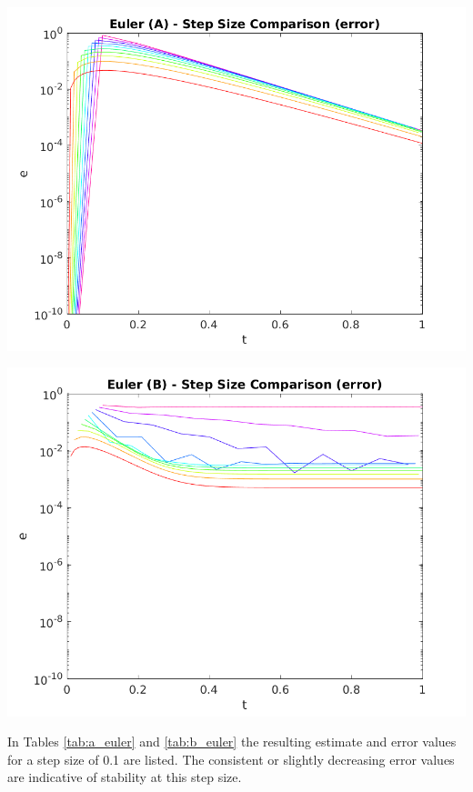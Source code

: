 \documentclass{article}
\begin{document}
\begin{center}
	\centering
    \begin{minipage}{0.5\textwidth}
        \centering
	    \includegraphics[width=1\textwidth]{../output/a_euler_h_err.png}
    \end{minipage}\hfill
    \begin{minipage}{0.5\textwidth}
        \centering
	    \includegraphics[width=1\textwidth]{../output/b_euler_h_err.png}
    \end{minipage}
 	\label{fig:euler_h_err}
\end{center}

In Tables \ref{tab:a_euler} and \ref{tab:b_euler} the resulting estimate and error values for a step size of 0.1 are listed. The consistent or slightly decreasing error values are indicative of stability at this step size.
\end{document}
